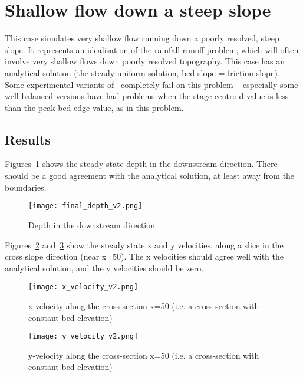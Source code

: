 \section{Shallow flow down a steep slope}
This case simulates very shallow flow running down a poorly resolved, steep slope. It represents an idealisation of the rainfall-runoff problem, which will often involve very shallow flows down poorly resolved topography. This case has an analytical solution (the steady-uniform solution, bed slope = friction slope). Some experimental variants of \anuga ~completely fail on this problem -- especially some well balanced versions have had problems when the stage centroid value is less than the peak bed edge value, as in this problem.  

\subsection{Results}
Figures~\ref{depthdownchan} shows the steady state depth in the downstream direction. There should be a good agreement with the analytical solution, at least away from the boundaries.  

\begin{figure}[h]
\begin{center}
\texttt{[image: final\_depth\_v2.png]}
\caption{Depth in the downstream direction}
\label{depthdownchan}
\end{center}
\end{figure}

Figures~\ref{xvelscrosschan} and~\ref{yvelscroschan} show the steady state x and y velocities, along a slice in the cross slope direction (near x=50). The x velocities should agree well with the analytical solution, and the y velocities should be zero.  

\begin{figure}[h]
\begin{center}
\texttt{[image: x\_velocity\_v2.png]}
\caption{x-velocity along the cross-section x=50 (i.e. a cross-section with constant bed elevation)}
\label{xvelscrosschan}
\end{center}
\end{figure}

\begin{figure}[h]
\begin{center}
\texttt{[image: y\_velocity\_v2.png]}
\caption{y-velocity along the cross-section x=50 (i.e. a cross-section with constant bed elevation)}
\label{yvelscroschan}
\end{center}
\end{figure}


\endinput
